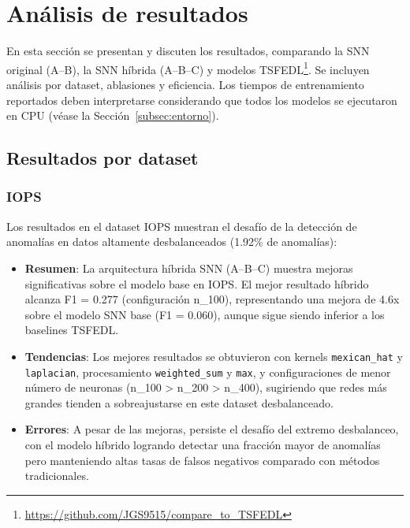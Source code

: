 \section{Análisis de resultados}

En esta sección se presentan y discuten los resultados, comparando la SNN original (A--B), la SNN híbrida (A--B--C) y modelos TSFEDL\footnote{\url{https://github.com/JGS9515/compare_to_TSFEDL}}. Se incluyen análisis por dataset, ablasiones y eficiencia.  Los tiempos de entrenamiento reportados deben interpretarse considerando que todos los modelos se ejecutaron en CPU (véase la Sección~\ref{subsec:entorno}).

\subsection{Resultados por dataset}

\subsubsection{IOPS}
Los resultados en el dataset IOPS muestran el desafío de la detección de anomalías en datos altamente desbalanceados (1.92\% de anomalías):
\begin{itemize}
    \item \textbf{Resumen}: La arquitectura híbrida SNN (A--B--C) muestra mejoras significativas sobre el modelo base en IOPS. El mejor resultado híbrido alcanza F1 = 0.277 (configuración n\_100), representando una mejora de 4.6x sobre el modelo SNN base (F1 = 0.060), aunque sigue siendo inferior a los baselines TSFEDL.
    \item \textbf{Tendencias}: Los mejores resultados se obtuvieron con kernels \texttt{mexican\_hat} y \texttt{laplacian}, procesamiento \texttt{weighted\_sum} y \texttt{max}, y configuraciones de menor número de neuronas (n\_100 > n\_200 > n\_400), sugiriendo que redes más grandes tienden a sobreajustarse en este dataset desbalanceado.
    \item \textbf{Errores}: A pesar de las mejoras, persiste el desafío del extremo desbalanceo, con el modelo híbrido logrando detectar una fracción mayor de anomalías pero manteniendo altas tasas de falsos negativos comparado con métodos tradicionales.
\end{itemize}

